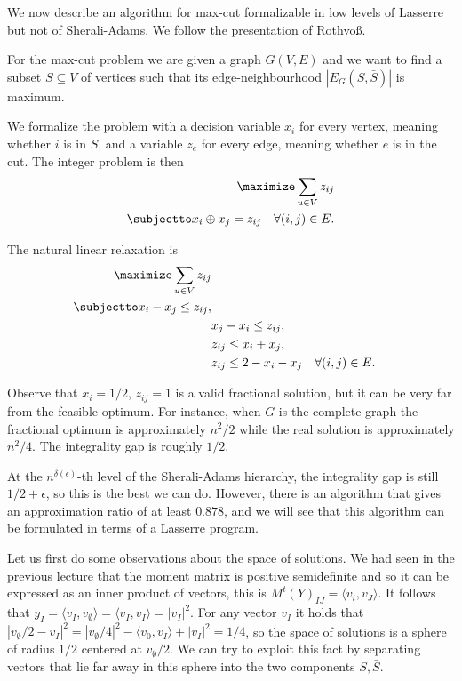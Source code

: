 \documentclass[a4paper,twoside,justified]{tufte-handout}
\begin{document}
We now describe an algorithm for max-cut formalizable in low levels of Lasserre but not of Sherali-Adams. We follow the presentation of Rothvoß\cite{lasserresurvey2013}.

For the max-cut problem we are given a graph $G(V,E)$ and we want to find a subset $S \subseteq V$ of vertices such that its edge-neighbourhood $|E_G(S,\bar S)|$ is maximum.

We formalize the problem with a decision variable $x_i$ for every vertex, meaning whether $i$ is in $S$, and a variable $z_e$ for every edge, meaning whether $e$ is in the cut. The integer problem is then
\begin{alignat}{2}
\label{eq:integer-max-cut}
  \maximize \sum_{u\in V} z_{ij}\notag \\
  \subjectto x_i \oplus x_j = z_{ij} \quad \forall{(i,j)\in E}.
\end{alignat}

The natural linear relaxation is
\begin{alignat}{2}
\label{eq:max-cut}
  \maximize \sum_{u\in V} z_{ij}\notag \\
  \subjectto x_i - x_j \leq z_{ij},\notag \\
& x_j - x_i \leq z_{ij},\notag \\
& z_{ij} \leq x_i + x_j,\notag \\
& z_{ij} \leq 2 - x_i - x_j \quad \forall{(i,j)\in E}.
\end{alignat}

Observe that $x_i=1/2$, $z_{ij}=1$ is a valid fractional solution, but it can be very far from the feasible optimum. For instance, when $G$ is the complete graph the fractional optimum is approximately $n^2/2$ while the real solution is approximately $n^2/4$. The integrality gap is roughly $1/2$.

At the $n^{\delta(\epsilon)}$-th level of the Sherali-Adams hierarchy, the integrality gap is still $1/2+\epsilon$, so this is the best we can do\cite{charikar2009integrality}. However, there is an algorithm\cite{goemans1995improved} that gives an approximation ratio of at least $0.878$, and we will see that this algorithm can be formulated in terms of a Lasserre program.

Let us first do some observations about the space of solutions. We had seen in the previous lecture that the moment matrix is positive semidefinite and so it can be expressed as an inner product of vectors, this is $M^t(Y)_{IJ}=\langle v_i, v_J \rangle$. It follows that $y_I=\langle v_I,v_\emptyset \rangle = \langle v_I,v_I \rangle = | v_I |^2$. For any vector $v_I$ it holds that $|v_\emptyset/2-v_I|^2=|v_\emptyset/4|^2-\langle v_0,v_I\rangle+|v_I|^2=1/4$, so the space of solutions is a sphere of radius $1/2$ centered at $v_\emptyset/2$. We can try to exploit this fact by separating vectors that lie far away in this sphere into the two components $S,\bar S$.
\end{document}
